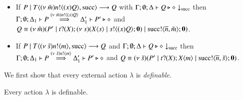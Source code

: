 \begin{definition}[Definibility]
\begin{itemize}
		\item	If $P \;|\; T\langle (\nu\ \tilde{m})n ! \langle (x)Q \rangle, \textrm{succ} \rangle \longrightarrow Q$
			with $\Gamma; \emptyset; \Delta \vdash Q \triangleright \diamond \downarrow_{\textrm{succ}}$ then
			$\Gamma; \emptyset; \Delta_1 \vdash P \stackrel{(\nu\ \tilde{m})n ! \langle (x)Q \rangle}{\Longrightarrow} \Delta_1' \vdash P' \triangleright \diamond$
			and $Q \equiv (\nu\ \tilde{m})(P' \;|\; t ? (X) ; (\nu\ s)(X\langle s \rangle \;|\; s ! \langle (x) Q \rangle ; \mathbf{0}) \;|\; \textrm{succ} ! \langle \overline{n}, \tilde{m} \rangle ; \mathbf{0})$.

		\item	If $P \;|\; T\langle (\nu\ \tilde{s})n ! \langle m \rangle, \textrm{succ} \rangle \longrightarrow Q $
			and $\Gamma; \emptyset; \Delta \vdash Q \triangleright \diamond \downarrow_{\textrm{succ}}$ then
			$\Gamma; \emptyset; \Delta_1 \vdash P \stackrel{(\nu\ \tilde{s})n ! \langle m \rangle}{\Longrightarrow} \Delta_1' \vdash P' \triangleright \diamond$
			and $Q \equiv (\nu\ \tilde{s})(P' \;|\; t ? (X) ; X\langle m \rangle \;|\; \textrm{succ} ! \langle \overline{n}, \tilde{s} \rangle ; \mathbf{0})$.


	\end{itemize}	
%
\end{definition}

We first show that every external action $\lambda$ is {\em definable}.

\begin{lemma}[Definibility]
	Every action $\lambda$ is definable.
\end{lemma}

